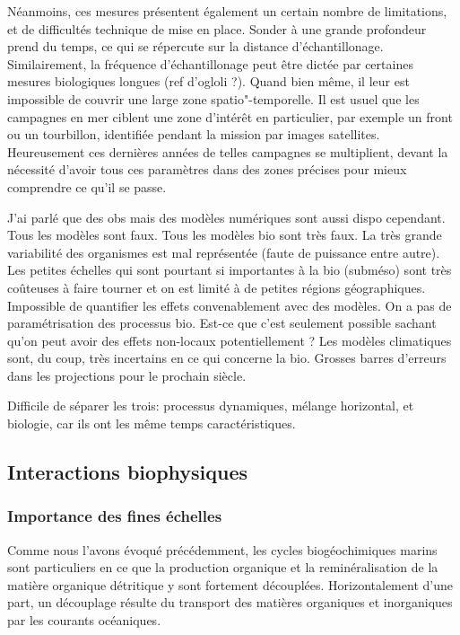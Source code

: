 Néanmoins, ces mesures présentent également un certain nombre de limitations, et de difficultés technique de mise en place.
Sonder à une grande profondeur prend du temps, ce qui se répercute sur la distance d'échantillonage.
Similairement, la fréquence d'échantillonage peut être dictée par certaines mesures biologiques longues (ref d'ogloli ?).
Quand bien même, il leur est impossible de couvrir une large zone spatio"-temporelle.
Il est usuel que les campagnes en mer ciblent une zone d'intérêt en particulier, par exemple un front ou un tourbillon, identifiée pendant la mission par images satellites.
Heureusement ces dernières années de telles campagnes se multiplient, devant la nécessité d'avoir tous ces paramètres dans des zones précises pour mieux comprendre ce qu'il se passe.

J'ai parlé que des obs mais des modèles numériques sont aussi dispo cependant.
Tous les modèles sont faux. Tous les modèles bio sont très faux.
La très grande variabilité des organismes est mal représentée (faute de puissance entre autre). Les petites échelles qui sont pourtant si importantes à la bio (subméso) sont très coûteuses à faire tourner et on est limité à de petites régions géographiques. Impossible de quantifier les effets convenablement avec des modèles.
On a pas de paramétrisation des processus bio. Est-ce que c'est seulement possible sachant qu'on peut avoir des effets non-locaux potentiellement ?
Les modèles climatiques sont, du coup, très incertains en ce qui concerne la bio.
Grosses barres d'erreurs dans les projections pour le prochain siècle.

Difficile de séparer les trois: processus dynamiques, mélange horizontal, et biologie, car ils ont les même temps caractéristiques.

\subsection{Interactions biophysiques}
\label{sec:interactions-biophys}

\subsubsection{Importance des fines échelles}

Comme nous l'avons évoqué précédemment, les cycles biogéochimiques marins sont particuliers en ce que la production organique et la reminéralisation de la matière organique détritique y sont fortement découplées.
Horizontalement d'une part, un découplage résulte du transport des matières organiques et inorganiques par les courants océaniques.

